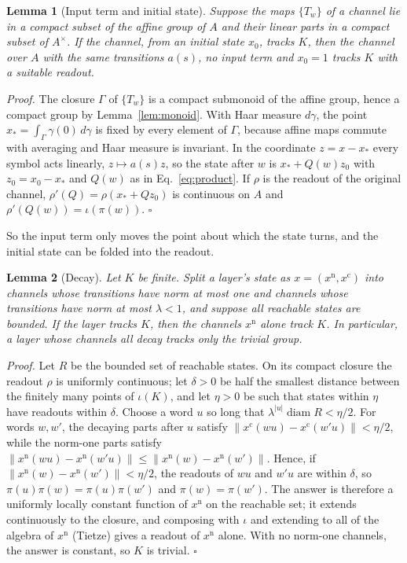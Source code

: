 \documentclass[aps,prx,reprint,superscriptaddress,longbibliography,nofootinbib,floatfix]{revtex4-2}
\theoremstyle{plain}
\newtheorem{lemma}{Lemma}
\theoremstyle{definition}
\begin{document}
\begin{lemma}[Input term and initial state]\label{lem:affine}
Suppose the maps $\{T_w\}$ of a channel lie in a compact subset of the
affine group of $A$ and their linear parts in a compact subset of
$A^\times$. If the channel, from an initial state $x_0$, tracks $K$, then
the channel over $A$ with the same transitions $a(s)$, no input term and
$x_0=1$ tracks $K$ with a suitable readout.
\end{lemma}
\emph{Proof.} The closure $\Gamma$ of $\{T_w\}$ is a compact submonoid of
the affine group, hence a compact group by Lemma~\ref{lem:monoid}. With
Haar measure $d\gamma$, the point $x_*=\int_\Gamma\gamma(0)\,d\gamma$ is
fixed by every element of $\Gamma$, because affine maps commute with
averaging and Haar measure is invariant. In the coordinate $z=x-x_*$ every
symbol acts linearly, $z\mapsto a(s)z$, so the state after $w$ is
$x_*+Q(w)z_0$ with $z_0=x_0-x_*$ and $Q(w)$ as in Eq.~\eqref{eq:product}.
If $\rho$ is the readout of the original channel, $\rho'(Q)=\rho(x_*+Qz_0)$
is continuous on $A$ and $\rho'(Q(w))=\iota(\pi(w))$. $\square$

So the input term only moves the point about which the state turns, and
the initial state can be folded into the readout.

\begin{lemma}[Decay]\label{lem:decay}
Let $K$ be finite. Split a layer's state as $x=(x^{\mathrm n},x^{\mathrm c})$
into channels whose transitions have norm at most one and channels whose
transitions have norm at most $\lambda<1$, and suppose all reachable states are bounded.
If the layer tracks $K$, then the channels $x^{\mathrm n}$ alone track $K$.
In particular, a layer whose channels all decay tracks only the trivial
group.
\end{lemma}
\emph{Proof.} Let $R$ be the bounded set of reachable states. On its compact
closure the readout $\rho$ is uniformly continuous; let $\delta>0$ be half
the smallest distance between the finitely many points of $\iota(K)$, and
let $\eta>0$ be such that states within $\eta$ have readouts within
$\delta$. Choose a word $u$ so long that $\lambda^{|u|}\operatorname{diam}R<\eta/2$.
For words $w,w'$, the decaying parts after $u$ satisfy
$\|x^{\mathrm c}(wu)-x^{\mathrm c}(w'u)\|<\eta/2$, while the norm-one parts
satisfy $\|x^{\mathrm n}(wu)-x^{\mathrm n}(w'u)\|\le\|x^{\mathrm n}(w)-x^{\mathrm n}(w')\|$.
Hence, if $\|x^{\mathrm n}(w)-x^{\mathrm n}(w')\|<\eta/2$, the readouts of
$wu$ and $w'u$ are within $\delta$, so $\pi(u)\pi(w)=\pi(u)\pi(w')$ and
$\pi(w)=\pi(w')$. The answer is therefore a uniformly locally constant
function of $x^{\mathrm n}$ on the reachable set; it extends continuously to
the closure, and composing with $\iota$ and extending to all of the algebra
of $x^{\mathrm n}$ (Tietze) gives a readout of $x^{\mathrm n}$ alone. With
no norm-one channels, the answer is constant, so $K$ is trivial. $\square$
\end{document}
